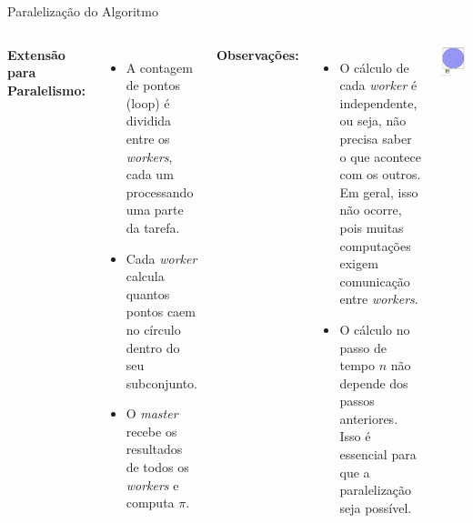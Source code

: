 \documentclass{beamer}
\begin{document}
	\begin{frame}{Paralelização do Algoritmo}
		
		\begin{columns}[T]
			\footnotesize
			\textbf{Extensão para Paralelismo:}
			\begin{itemize}
				\item A contagem de pontos (loop) é dividida entre os \textit{workers}, cada um processando uma parte da tarefa.
				\item Cada \textit{worker} calcula quantos pontos caem no círculo dentro do seu subconjunto.
				\item O \textit{master} recebe os resultados de todos os \textit{workers} e computa \(\pi\).
			\end{itemize}
			
			\textbf{Observações:}
			\begin{itemize}
				\item O cálculo de cada \textit{worker} é independente, ou seja, não precisa saber o que acontece com os outros. Em geral, isso não ocorre, pois muitas computações exigem comunicação entre \textit{workers}.
				\item O cálculo no passo de tempo \(n\) não depende dos passos anteriores. Isso é essencial para que a paralelização seja possível.
			\end{itemize}
			
			\includegraphics[scale=0.4]{par_circfig.png}
		\end{columns}
	\end{frame}
	
\end{document}
